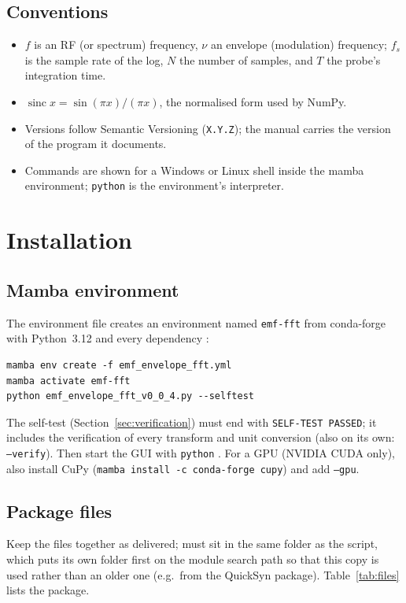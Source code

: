 \documentclass[10pt,letterpaper]{article}
\numberwithin{equation}{section}
\DeclareMathOperator{\sinc}{sinc}
\begin{document}
\subsection{Conventions}
\begin{itemize}
\item $f$ is an RF (or spectrum) frequency, $\nu$ an envelope (modulation)
frequency; $f_s$ is the sample rate of the log, $N$ the number of samples, and
$T$ the probe's integration time.
\item $\sinc x = \sin(\pi x)/(\pi x)$, the normalised form used by NumPy.
\item Versions follow Semantic Versioning (\texttt{X.Y.Z}); the manual carries
the version of the program it documents.
\item Commands are shown for a Windows or Linux shell inside the mamba
environment; \texttt{python} is the environment's interpreter.
\end{itemize}

\section{Installation}\label{sec:install}

\subsection{Mamba environment}
The environment file creates an environment named \texttt{emf-fft} from
conda-forge with Python~3.12 and every dependency \cite{B36}:
\begin{Verbatim}
mamba env create -f emf_envelope_fft.yml
mamba activate emf-fft
python emf_envelope_fft_v0_0_4.py --selftest
\end{Verbatim}
The self-test (Section~\ref{sec:verification}) must end with
\texttt{SELF-TEST PASSED}; it includes the verification of every transform and
unit conversion (also on its own: \texttt{--verify}). Then start the GUI with
\texttt{python} . For a GPU (NVIDIA CUDA only), also install CuPy
(\texttt{mamba install -c conda-forge cupy}) and add \texttt{--gpu}.

\subsection{Package files}
Keep the files together as delivered;  must sit in the
same folder as the script, which puts its own folder first on the module search
path so that this copy is used rather than an older one (e.g.\ from the
QuickSyn package). Table~\ref{tab:files} lists the package.
\end{document}
